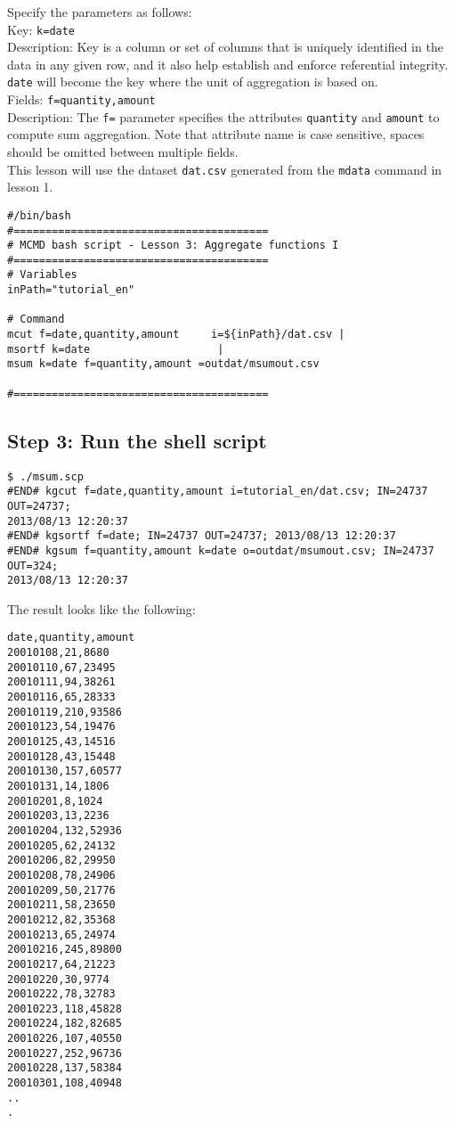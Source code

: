 {\setlength{\parindent}{0cm}

Specify the parameters as follows: \\

Key: 		\verb|k=date| \\
Description: 	Key is a column or set of columns that is uniquely identified in the data in any given row, and it also help establish and enforce referential integrity. \verb|date| will become the key where the unit of aggregation is based on.\\

Fields: 	\verb|f=quantity,amount| \\
Description:  		The \verb|f=| parameter specifies the attributes \verb|quantity| and \verb|amount| to compute sum aggregation.  Note that attribute name is case sensitive, spaces should be omitted between multiple fields.\\

This lesson will use the dataset \verb|dat.csv| generated from the \verb|mdata| command in lesson 1. 
}

\begin{verbatim}
#/bin/bash
#========================================
# MCMD bash script - Lesson 3: Aggregate functions I
#========================================
# Variables
inPath="tutorial_en"

# Command 
mcut f=date,quantity,amount     i=${inPath}/dat.csv |
msortf k=date                    |
msum k=date f=quantity,amount =outdat/msumout.csv

#========================================
\end{verbatim}

\subsection*{Step 3: Run the shell script }

\begin{verbatim}
$ ./msum.scp
#END# kgcut f=date,quantity,amount i=tutorial_en/dat.csv; IN=24737 OUT=24737; 
2013/08/13 12:20:37
#END# kgsortf f=date; IN=24737 OUT=24737; 2013/08/13 12:20:37
#END# kgsum f=quantity,amount k=date o=outdat/msumout.csv; IN=24737 OUT=324; 
2013/08/13 12:20:37

\end{verbatim}

\noindent
The result looks like the following: 

\begin{verbatim}
date,quantity,amount
20010108,21,8680
20010110,67,23495
20010111,94,38261
20010116,65,28333
20010119,210,93586
20010123,54,19476
20010125,43,14516
20010128,43,15448
20010130,157,60577
20010131,14,1806
20010201,8,1024
20010203,13,2236
20010204,132,52936
20010205,62,24132
20010206,82,29950
20010208,78,24906
20010209,50,21776
20010211,58,23650
20010212,82,35368
20010213,65,24974
20010216,245,89800
20010217,64,21223
20010220,30,9774
20010222,78,32783
20010223,118,45828
20010224,182,82685
20010226,107,40550
20010227,252,96736
20010228,137,58384
20010301,108,40948
..
.
\end{verbatim}

